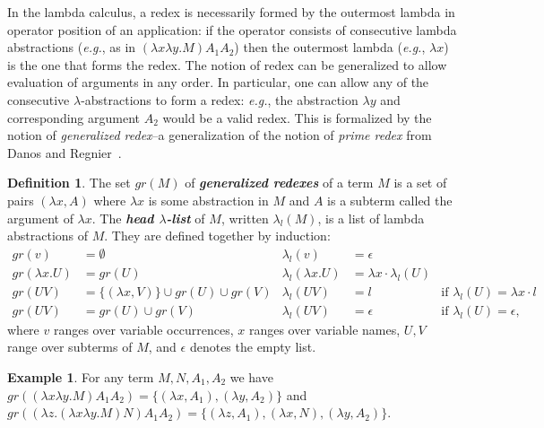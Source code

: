 \documentclass[xchauthor,chkrefs,GCNS,amsmath,amsthm,rotating,leaveRGB]{tcsg}
\renewcommand{\index}[1]{}
\theoremstyle{plain}
\theoremstyle{definition}
\newtheorem{definition}{Definition}[section]
\newtheorem{example}{Example}[section]
\begin{document}
In the lambda calculus, a redex is necessarily formed by the outermost lambda
in operator position of an application: if the operator consists of
consecutive lambda abstractions (\textit{e.g.}, as in $(\lambda x \lambda y .
M) A_{1} A_{2}$) then the outermost lambda (\textit{e.g.}, $\lambda x$) is
the one that forms the redex. The notion of redex can be generalized to allow
evaluation of arguments in any order. In particular, one can allow any of the
consecutive $\lambda $-abstractions to form a redex: \textit{e.g.}, the
abstraction $\lambda y$ and corresponding argument $A_{2}$ would be a valid
redex. This is formalized by the notion of \emph{generalized redex}--a
generalization of the notion of \emph{prime redex} from Danos and
Regnier~\cite{danos-head,REGNIER1994281}.

\begin{definition}\label{dfn:generalized_redex}
The set $gr(M)$ of \textbf{\emph{generalized redexes}}\index{generalized
redexes} of a term $M$ is a set of pairs $(\lambda x, A)$ where $\lambda x$
is some abstraction in $M$ and $A$ is a subterm called the argument of
$\lambda x$. The \textbf{\emph{head $\lambda  $-list}}\index{head $\lambda
$-list} of $M$, written $\lambda _{l}(M)$, is a list of lambda abstractions
of $M$. They are defined together by induction:
%
\begin{align*}
gr(v) &= \emptyset & \lambda _{l}(v) &= \epsilon \\
gr(\lambda x. U) &= gr(U) & \lambda _{l}(\lambda x. U) &= \lambda x \cdot \lambda _{l}(U) \\
gr(U V) &= \{ (\lambda x, V) \} \cup  gr(U) \cup  gr(V) &
\lambda _{l}(U V) &= l & \mbox{if $\lambda _{l}(U) = \lambda x \cdot l$} \\
gr(U V) &= gr(U) \cup  gr(V) & \lambda _{l}(U V) &= \epsilon & \mbox{if $\lambda _{l}(U) = \epsilon $,}
\end{align*}
where $v$ ranges over variable occurrences, $x$ ranges over variable names,
$U, V$ range over subterms of $M$, and $\epsilon $ denotes the empty list.
\end{definition}

\begin{example}
For any term $M, N, A_{1}, A_{2}$ we have $gr((\lambda x \lambda y . M) A_{1}
A_{2}) = \{ (\lambda x, A_{1}), (\lambda y, A_{2})\}$ and $gr((\lambda z .
(\lambda x \lambda y . M) N) A_{1} A_{2}) = \{ (\lambda z, A_{1}), (\lambda
x, N), (\lambda y, A_{2})\}$.
\end{example}
\end{document}
